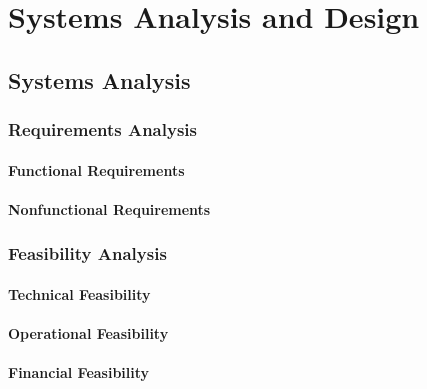 \chapter{Systems Analysis and Design}

\section{Systems Analysis}

\subsection{Requirements Analysis}

\subsubsection{Functional Requirements}

\subsubsection{Nonfunctional Requirements}

\subsection{Feasibility Analysis}

\subsubsection{Technical Feasibility}

\subsubsection{Operational Feasibility}

\subsubsection{Financial Feasibility}

